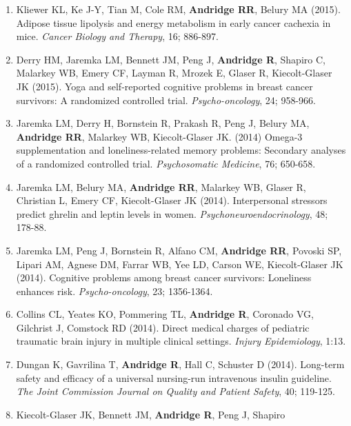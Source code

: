 \documentclass[
  english,
  letterpaper,
  DIV=11,
  numbers=noendperiod]{scrartcl}
\providecommand{\tightlist}{%
  \setlength{\itemsep}{0pt}\setlength{\parskip}{0pt}}
\begin{document}
\begin{enumerate}
  \begin{itemize}
  \tightlist
  \item
    Kiecolt-Glaser JK, \textbf{Andridge RR}, Belury MA (2015). Stress,
    Depression, and Metabolism: Replies to Bohan Brown et al.~and Barton
    and Yancey. \emph{Biological Psychiatry}, 78; e13-14.
  \end{itemize}
\item
  Kliewer KL, Ke J-Y, Tian M, Cole RM, \textbf{Andridge RR}, Belury MA
  (2015). Adipose tissue lipolysis and energy metabolism in early cancer
  cachexia in mice. \emph{Cancer Biology and Therapy}, 16; 886-897.
\item
  Derry HM, Jaremka LM, Bennett JM, Peng J, \textbf{Andridge R}, Shapiro
  C, Malarkey WB, Emery CF, Layman R, Mrozek E, Glaser R, Kiecolt-Glaser
  JK (2015). Yoga and self-reported cognitive problems in breast cancer
  survivors: A randomized controlled trial. \emph{Psycho-oncology}, 24;
  958-966.
\item
  Jaremka LM, Derry H, Bornstein R, Prakash R, Peng J, Belury MA,
  \textbf{Andridge RR}, Malarkey WB, Kiecolt-Glaser JK. (2014) Omega-3
  supplementation and loneliness-related memory problems: Secondary
  analyses of a randomized controlled trial. \emph{Psychosomatic
  Medicine}, 76; 650-658.
\item
  Jaremka LM, Belury MA, \textbf{Andridge RR}, Malarkey WB, Glaser R,
  Christian L, Emery CF, Kiecolt-Glaser JK (2014). Interpersonal
  stressors predict ghrelin and leptin levels in women.
  \emph{Psychoneuroendocrinology}, 48; 178-88.
\item
  Jaremka LM, Peng J, Bornstein R, Alfano CM, \textbf{Andridge RR},
  Povoski SP, Lipari AM, Agnese DM, Farrar WB, Yee LD, Carson WE,
  Kiecolt-Glaser JK (2014). Cognitive problems among breast cancer
  survivors: Loneliness enhances risk. \emph{Psycho-oncology}, 23;
  1356-1364.
\item
  Collins CL, Yeates KO, Pommering TL, \textbf{Andridge R}, Coronado VG,
  Gilchrist J, Comstock RD (2014). Direct medical charges of pediatric
  traumatic brain injury in multiple clinical settings. \emph{Injury
  Epidemiology}, 1:13.
\item
  Dungan K, Gavrilina T, \textbf{Andridge R}, Hall C, Schuster D (2014).
  Long-term safety and efficacy of a universal nursing-run intravenous
  insulin guideline. \emph{The Joint Commission Journal on Quality and
  Patient Safety}, 40; 119-125.
\item
  Kiecolt-Glaser JK, Bennett JM, \textbf{Andridge R}, Peng J, Shapiro

\end{enumerate}
\end{document}
